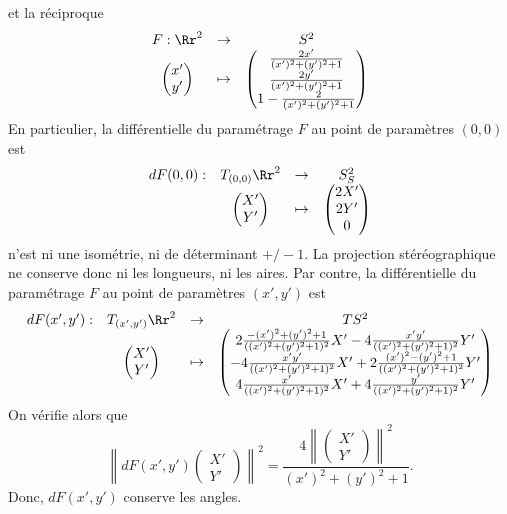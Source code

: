{{et la réciproque
$$\begin{array}{ccc}
F : \Rr^2&\to&S^2\\\begin{pmatrix}x'\\y'\end{pmatrix}&\mapsto&
\begin{pmatrix} \frac{2x'}{(x')^2+(y')^2+1}\\ \frac{2y'}{(x')^2+(y')^2+1}\\1-\frac{2}{(x')^2+(y')^2+1}\end{pmatrix}
\end{array}
$$
En particulier, la différentielle du paramétrage $F$ au point de paramètres $(0,0)$ est 
$$\begin{array}{cccc}
dF(0,0) : &T_{(0,0)}\Rr^2&\to&S_S^2\\ &\begin{pmatrix}X'\\Y'\end{pmatrix}&\mapsto&
\begin{pmatrix} 2X'\\ 2Y'\\0\end{pmatrix}
\end{array}
$$ n'est ni une isométrie, ni de déterminant $+/-1$.
La projection stéréographique ne conserve donc ni les longueurs, ni les aires.
Par contre, la différentielle du paramétrage $F$ au point de paramètres $(x',y')$ est 
$$\begin{array}{cccc}
dF(x',y') :& T_{(x',y')}\Rr^2&\to&TS^2\\ & \begin{pmatrix}X'\\Y'\end{pmatrix}&\mapsto&
\begin{pmatrix} 2\frac{-(x')^2+(y')^2+1}{((x')^2+(y')^2+1)^2}X'-4\frac{x'y'}{((x')^2+(y')^2+1)^2}Y'
\\ -4\frac{x'y'}{((x')^2+(y')^2+1)^2}X'+ 2\frac{(x')^2-(y')^2+1}{((x')^2+(y')^2+1)^2}Y'\\ 
4\frac{x'}{((x')^2+(y')^2+1)^2}X'+4\frac{y'}{((x')^2+(y')^2+1)^2}Y'\end{pmatrix}
\end{array}
$$
On vérifie alors que
$$\left\| dF(x',y')\begin{pmatrix}X'\\Y'\end{pmatrix}\right\|^2=\frac{4\left\|\begin{pmatrix}X'\\Y'\end{pmatrix}\right\|^2}{(x')^2+(y')^2+1}.$$
Donc, $dF(x',y')$ conserve les angles.
}
}
